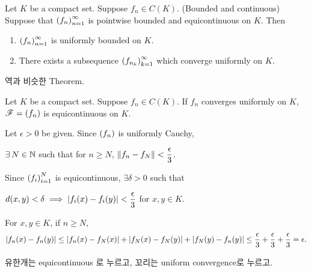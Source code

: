  Let \(K\) be a compact set. Suppose \(f_n \in C(K)\). (Bounded and continuous) Suppose that \(\left( f_n \right)_{n=1}^\infty\) is pointwise bounded and equicontinuous on \(K\). Then
\begin{enumerate}
    \item \(\left( f_n \right)_{n=1}^\infty\) is uniformly bounded on \(K\).
    \item There exists a subsequence \(\left( f_{n_k} \right)_{k=1}^\infty\) which converge uniformly on \(K\).
\end{enumerate}

\rmk 역과 비슷한 Theorem.

 Let \(K\) be a compact set. Suppose \(f_n \in C(K)\). If \(f_n\) converges uniformly on \(K\), \(\mathscr{F} = \left( f_n \right)\) is equicontinuous on \(K\).

\pf Let \(\epsilon > 0\) be given. Since \(\left( f_n \right)\) is uniformly Cauchy,
\begin{center}
    \(\exists N\in \N\) such that for \(n\geq N\), \(\left\lVert f_n  - f_N \right\rVert < \dfrac{\epsilon}{3}\).
\end{center}
Since \(\left( f_i \right)_{i=1}^N\) is equicontinuous, \(\exists \delta > 0\) such that
\begin{center}
    \(d(x, y) < \delta \implies \left| f_i(x) - f_i(y) \right| < \dfrac{\epsilon}{3}\) for \(x, y \in K\).
\end{center}
For \(x, y\in K\), if \(n \geq N\),
\[
    \left| f_n(x) - f_n(y) \right| \leq \left| f_n(x) - f_N(x) \right| + \left| f_N(x) - f_N(y) \right| + \left| f_N(y) - f_n(y) \right| \leq \frac{\epsilon}{3} + \frac{\epsilon}{3} + \frac{\epsilon}{3} = \epsilon.
\]

유한개는 equicontinuous 로 누르고, 꼬리는 uniform convergence로 누르고.

\pagebreak
